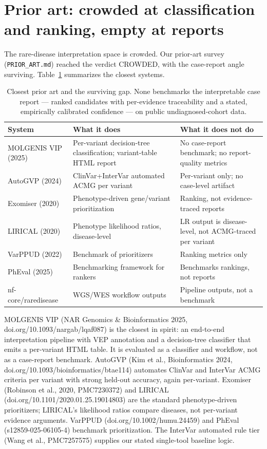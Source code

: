 \documentclass[11pt]{article}
\newcommand{\toprule}{\hline}
\newcommand{\midrule}{\hline}
\newcommand{\bottomrule}{\hline}
\begin{document}
\section{Prior art: crowded at classification and ranking, empty at reports}
\label{sec:priorart}
The rare-disease interpretation space is crowded. Our prior-art survey
(\texttt{PRIOR\_ART.md}) reached the verdict CROWDED, with the case-report angle
surviving. Table~\ref{tab:priorart} summarizes the closest systems.

\begin{table}[tb!]
\centering\small
\caption{Closest prior art and the surviving gap. None benchmarks the interpretable
case report --- ranked candidates with per-evidence traceability and a stated,
empirically calibrated confidence --- on public undiagnosed-cohort data.}
\label{tab:priorart}
\begin{tabular}{p{2.6cm}p{4.6cm}p{4.2cm}}
\toprule
System & What it does & What it does not do \\
\midrule
MOLGENIS VIP (2025) & Per-variant decision-tree classification; variant-table HTML report & No case-report benchmark; no report-quality metrics \\
AutoGVP (2024) & ClinVar+InterVar automated ACMG per variant & Per-variant only; no case-level artifact \\
Exomiser (2020) & Phenotype-driven gene/variant prioritization & Ranking, not evidence-traced reports \\
LIRICAL (2020) & Phenotype likelihood ratios, disease-level & LR output is disease-level, not ACMG-traced per variant \\
VarPPUD (2022) & Benchmark of prioritizers & Ranking metrics only \\
PhEval (2025) & Benchmarking framework for rankers & Benchmarks rankings, not reports \\
nf-core/raredisease & WGS/WES workflow outputs & Pipeline outputs, not a benchmark \\
\bottomrule
\end{tabular}
\end{table}

MOLGENIS VIP (NAR Genomics \& Bioinformatics 2025,
doi.org/10.1093/nargab/lqaf087) is the closest in spirit: an end-to-end
interpretation pipeline with VEP annotation and a decision-tree classifier that emits
a per-variant HTML table. It is evaluated as a classifier and workflow, not as a
case-report benchmark. AutoGVP (Kim et al., Bioinformatics 2024,
doi.org/10.1093/bioinformatics/btae114) automates ClinVar and InterVar ACMG criteria
per variant with strong held-out accuracy, again per-variant. Exomiser (Robinson et
al., 2020, PMC7230372) and LIRICAL (doi.org/10.1101/2020.01.25.19014803) are the
standard phenotype-driven prioritizers; LIRICAL's likelihood ratios compare diseases,
not per-variant evidence arguments. VarPPUD (doi.org/10.1002/humu.24459) and PhEval
(s12859-025-06105-4) benchmark prioritization. The InterVar automated rule tier
(Wang et al., PMC7257575) supplies our stated single-tool baseline logic.
\end{document}
